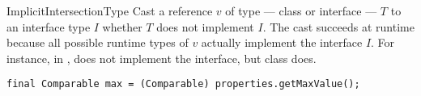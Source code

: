 \begin{pattern}{ImplicitIntersectionType}
Cast a reference $v$ of type --- class or interface --- $T$ to an
interface type $I$ whether $T$ does not implement $I$.
The cast succeeds at runtime because all possible runtime types of $v$
actually implement the interface $I$.
For instance, in ,  does not
implement the  interface, but class  does.

\instances{}

\begin{lstlisting}[style=java,caption=From \url{http://bit.ly/2FQOt4v}]
final Comparable max = (Comparable) properties.getMaxValue();
\end{lstlisting}

\detection{}

\discussion{}

\related{}

\end{pattern}